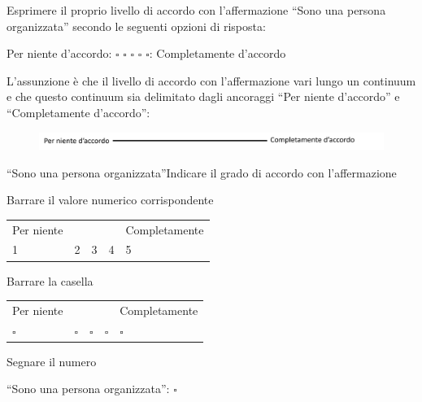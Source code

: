 \documentclass[compress]{beamer}
\begin{document}
\begin{frame}

		
		Esprimere il proprio livello di accordo con l'affermazione ``Sono una persona organizzata'' secondo le seguenti opzioni di risposta: 
		
		\begin{center}
			Per niente d'accordo:	$\square$ \hspace{2mm} $\square$ \hspace{2mm} $\square$ \hspace{2mm} $\square$ \hspace{2mm} $\square$: Completamente d'accordo
		\end{center}

L'assunzione è che il livello di accordo con l'affermazione vari lungo un continuum e che questo continuum sia delimitato dagli ancoraggi ``Per niente d'accordo'' e ``Completamente d'accordo'': 

\pause
\begin{figure}
	\centering
	\includegraphics[width=0.9\linewidth]{accordo}
\end{figure}

\end{frame}

\begin{frame}{``Sono una persona organizzata''}{Indicare il grado di accordo con l'affermazione}
	
	\begin{block}{Barrare il valore numerico corrispondente}
		
		\begin{tabular}{p{2cm} p{2cm}  p{2cm}  p{2cm}  p{2cm} }
			Per niente & & & & Completamente \\
			1 & 2 & 3 & 4& 5 \\
		\end{tabular}
	\end{block}
	
		\begin{block}{Barrare la casella}
			
		\begin{tabular}{p{2cm} p{2cm}  p{2cm}  p{2cm}  p{2cm} }
			Per niente & & & & Completamente \\
			$\square$ & $\square$ & $\square$ & $\square$& $\square$ \\
		\end{tabular}
	\end{block}
	
\begin{block}{Segnare il numero}
	
	``Sono una persona organizzata'': \hspace{2cm} \large $\square$
\end{block}

	
\end{frame}
\end{document}
